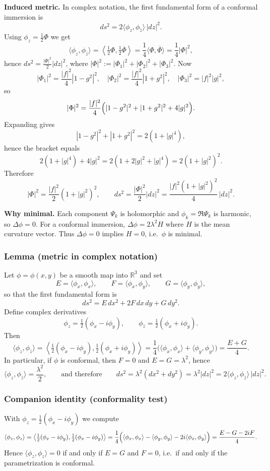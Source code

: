 \documentclass[12pt,a4paper]{article}
\theoremstyle{plain}
\theoremstyle{definition}      %
\begin{document}
\smallskip
\textbf{Induced metric.}
In complex notation, the first fundamental form of a conformal immersion is
\[
ds^2 = 2\langle \phi_z,\phi_{\bar z}\rangle\,|dz|^2.
\]
Using $\phi_z=\tfrac12\Phi$ we get
\[
\langle \phi_z,\phi_{\bar z}\rangle
=
\left\langle \tfrac12\Phi,\tfrac12\overline{\Phi}\right\rangle
=
\frac14 \langle \Phi,\overline{\Phi}\rangle
=
\frac14|\Phi|^2,
\]
hence $ds^2=\frac{|\Phi|^2}{2}|dz|^2$, where $|\Phi|^2:=|\Phi_1|^2+|\Phi_2|^2+|\Phi_3|^2$.
Now
\[
|\Phi_1|^2=\frac{|f|^2}{4}|1-g^2|^2,\quad
|\Phi_2|^2=\frac{|f|^2}{4}|1+g^2|^2,\quad
|\Phi_3|^2=|f|^2|g|^2,
\]
so
\[
|\Phi|^2
=
\frac{|f|^2}{4}\Bigl(|1-g^2|^2+|1+g^2|^2+4|g|^2\Bigr).
\]
Expanding gives
\[
|1-g^2|^2+|1+g^2|^2 = 2(1+|g|^4),
\]
hence the bracket equals
\[
2(1+|g|^4)+4|g|^2=2(1+2|g|^2+|g|^4)=2(1+|g|^2)^2.
\]
Therefore
\[
|\Phi|^2=\frac{|f|^2}{2}(1+|g|^2)^2,
\qquad
ds^2=\frac{|\Phi|^2}{2}|dz|^2
=\frac{|f|^2(1+|g|^2)^2}{4}\,|dz|^2.
\]

\smallskip
\textbf{Why minimal.}
Each component $\Psi_k$ is holomorphic and $\phi_k=\Re\Psi_k$ is harmonic, so $\Delta\phi=0$.
For a conformal immersion, $\Delta\phi=2\lambda^2 H$ where $H$ is the mean curvature vector.
Thus $\Delta\phi=0$ implies $H=0$, i.e.\ $\phi$ is minimal.

\medskip

\subsubsection*{Lemma (metric in complex notation)}
Let $\phi=\phi(x,y)$ be a smooth map into $\mathbb R^3$ and set
\[
E=\langle \phi_x,\phi_x\rangle,\qquad
F=\langle \phi_x,\phi_y\rangle,\qquad
G=\langle \phi_y,\phi_y\rangle,
\]
so that the first fundamental form is
\[
ds^2=E\,dx^2+2F\,dx\,dy+G\,dy^2.
\]
Define complex derivatives
\[
\phi_z=\tfrac12(\phi_x-i\phi_y),\qquad
\phi_{\bar z}=\tfrac12(\phi_x+i\phi_y).
\]
Then
\[
\langle \phi_z,\phi_{\bar z}\rangle
=
\left\langle \tfrac12(\phi_x-i\phi_y),\tfrac12(\phi_x+i\phi_y)\right\rangle
=
\frac14\bigl(\langle \phi_x,\phi_x\rangle+\langle \phi_y,\phi_y\rangle\bigr)
=
\frac{E+G}{4}.
\]
In particular, if $\phi$ is conformal, then $F=0$ and $E=G=\lambda^2$, hence
\[
\langle \phi_z,\phi_{\bar z}\rangle=\frac{\lambda^2}{2},
\qquad\text{and therefore}\qquad
ds^2=\lambda^2(dx^2+dy^2)=\lambda^2|dz|^2
=
2\langle \phi_z,\phi_{\bar z}\rangle\,|dz|^2.
\]

\medskip

\subsubsection*{Companion identity (conformality test)}
With $\phi_z=\tfrac12(\phi_x-i\phi_y)$ we compute
\[
\langle \phi_z,\phi_z\rangle
=
\left\langle \tfrac12(\phi_x-i\phi_y),\tfrac12(\phi_x-i\phi_y)\right\rangle
=
\frac14\Bigl(\langle \phi_x,\phi_x\rangle-\langle \phi_y,\phi_y\rangle-2i\langle \phi_x,\phi_y\rangle\Bigr)
=
\frac{E-G-2iF}{4}.
\]
Hence $\langle \phi_z,\phi_z\rangle=0$ if and only if $E=G$ and $F=0$, i.e.\ if and only if the parametrization is conformal.
\end{document}
